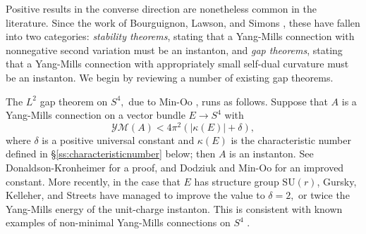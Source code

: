 \documentclass[12pt]{amsart}
\newcommand{\YM}{\mathcal{YM}}
\renewcommand{\1}{{\mathbf 1}}
\newcommand{\SU}{{\mathrm{SU} }}
\theoremstyle{others}
\numberwithin{equation}{section}
\begin{document}
Positive results in the converse direction are nonetheless common in the literature. Since the work of Bourguignon, Lawson, and Simons \cite{bourguignonlawson, bourguignonlawsonsimons}, these have fallen into two categories: \emph{stability theorems}, stating that a Yang-Mills connection with nonnegative second variation must be an instanton, and \emph{gap theorems}, stating that a Yang-Mills connection with appropriately small self-dual curvature
must be an instanton. %
We begin by reviewing a number of existing gap theorems.

The $L^2$ gap theorem on $S^4,$ due to Min-Oo \cite{minoogap}, runs as follows. Suppose that $A$ is
a Yang-Mills connection on a vector bundle $E \to S^4$ with
$$\YM(A) < 4 \pi^2 \left( |\kappa(E)| + \delta \right),$$
where $\delta$ is a positive universal constant and $\kappa(E)$ is the characteristic number defined in \S \ref{ss:characteristicnumber} below; then %
$A$ is an instanton. See Donaldson-Kronheimer \cite[\S 2.3.10]{donkron} for a proof, and Dodziuk and Min-Oo \cite{dodziukminoo} for an improved constant.
More recently, in the case that $E$ has structure group $\SU(r)$, Gursky, Kelleher, and Streets \cite{gurskykelleherstreets} have managed to improve the value to $\delta = 2,$ or twice the Yang-Mills energy of the unit-charge instanton. %
This is consistent with known examples of non-minimal Yang-Mills connections on $S^4$ \cite{bor, sadunsegert, sibnersuhlenbeck}.
\end{document}
